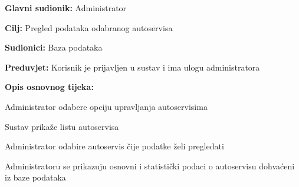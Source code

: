 	\noindent {}
\begin{packed_item}

	\item \textbf{Glavni sudionik: } Administrator
	\item  \textbf{Cilj:} Pregled podataka odabranog autoservisa
	\item  \textbf{Sudionici:} Baza podataka
	\item  \textbf{Preduvjet:} Korisnik je prijavljen u sustav i ima ulogu administratora
	\item  \textbf{Opis osnovnog tijeka:}

	\item[] \begin{packed_enum}

		\item Administrator odabere opciju upravljanja autoservisima
		\item Sustav prikaže listu autoservisa
		\item Administrator odabire autoservis čije podatke želi pregledati
		\item Administratoru se prikazuju osnovni i statistički podaci o autoservisu dohvaćeni iz baze podataka

	\end{packed_enum}
\end{packed_item}

